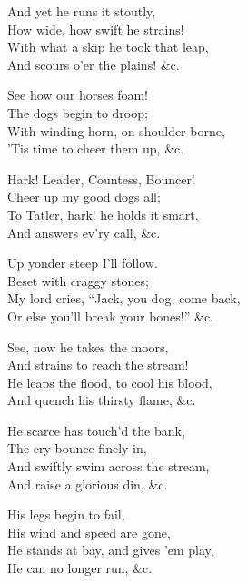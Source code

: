 \begin{dcverse}\begin{altverse}
And yet he runs it stoutly,\\
How wide, how swift he strains!\\
With what a skip he took that leap,\\
And scours o’er the plains! \&c.
\end{altverse}

\begin{altverse}
See how our horses foam!\\
The dogs begin to droop;\\
With winding horn, on shoulder borne,\\
’Tis time to cheer them up, \&c.
\end{altverse}

\begin{altverse}
Hark! Leader, Countess, Bouncer!\\
Cheer up my good dogs all;\\
To Tatler, hark! he holds it smart,\\
And answers ev’ry call, \&c.
\end{altverse}

\begin{altverse}
Up yonder steep I’ll follow.\\
Beset with craggy stones;\\
My lord cries, “Jack, you dog, come back,\\
Or else you’ll break your bones!” \&c.
\end{altverse}

\begin{altverse}
See, now he takes the moors,\\
And strains to reach the stream!\\
He leaps the flood, to cool his blood,\\
And quench his thirsty flame, \&c.
\end{altverse}

\begin{altverse}
He scarce has touch’d the bank,\\
The cry bounce finely in,\\
And swiftly swim across the stream,\\
And raise a glorious din, \&c.
\end{altverse}

\begin{altverse}
His legs begin to fail,\\
His wind and speed are gone,\\
He stands at bay, and gives ’em play,\\
He can no longer run, \&c.
\end{altverse}


\end{dcverse}
